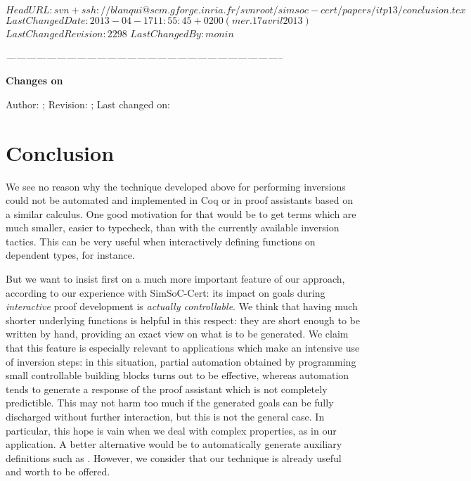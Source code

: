\svnidlong
{$HeadURL: svn+ssh://blanqui@scm.gforge.inria.fr/svnroot/simsoc-cert/papers/itp13/conclusion.tex $}
{$LastChangedDate: 2013-04-17 11:55:45 +0200 (mer. 17 avril 2013) $}
{$LastChangedRevision: 2298 $}
{$LastChangedBy: monin $}


\begin{thoughts}
\itshape
\hfil -----------------------------------------------------------------------------------\par
\hfil \textbf{Changes on \currfilename}

Author: \svnfileauthor; Revision: \svnfilerev; Last changed on: \svnfiledate
\end{thoughts}


\section{Conclusion}
\label{sec:conclusion}


We see no reason why
the technique developed above for performing inversions could not
be automated and implemented in Coq or in proof assistants
based on a similar calculus.
One good motivation for that would be to get terms which are 
much smaller, easier to typecheck,
than with the currently available inversion tactics.
This can be very useful when interactively defining functions
on dependent types, for instance. %

But we want to insist first on a much more important feature of
our approach, according to our experience with SimSoC-Cert:
its impact on goals during \emph{interactive} proof development
is \emph{actually controllable}.
We think that having much shorter underlying functions is
helpful in this respect:
they are short enough to be written by hand,
providing an exact view on what is to be generated.
We claim that this feature is especially relevant
to applications which make an intensive use of inversion steps:
in this situation, 
partial automation obtained by programming small controllable building blocks
turns out to be effective,
whereas automation tends to generate a 
response of the proof assistant which is not completely predictible. 
This may not harm too much if the generated goals can be fully discharged
without further interaction,
but this is not the general case.
In particular, this hope is vain when we deal with complex properties,
as in our application.
A better alternative would be to automatically generate 
auxiliary definitions such as .
However, we consider that our technique is already useful
and worth to be offered.

